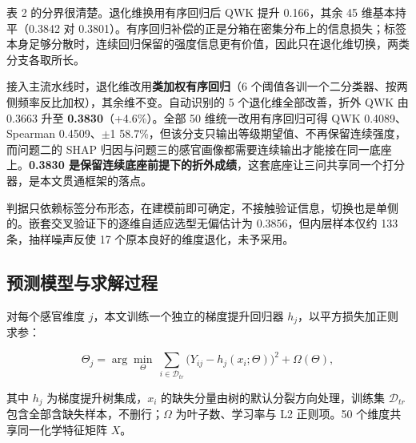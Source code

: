 \documentclass[zihao=-4,a4paper,UTF8,fontset=none]{ctexart}
\begin{document}
表 2 的分界很清楚。退化维换用有序回归后 QWK 提升 0.166，其余 45 维基本持平（0.3842 对 0.3801）。有序回归补偿的正是分箱在密集分布上的信息损失；标签本身足够分散时，连续回归保留的强度信息更有价值，因此只在退化维切换，两类分支各取所长。

接入主流水线时，退化维改用\textbf{类加权有序回归}（6 个阈值各训一个二分类器、按两侧频率反比加权），其余维不变。自动识别的 5 个退化维全部改善，折外 QWK 由 0.3663 升至 \textbf{0.3830}（+4.6\%）。全部 50 维统一改用有序回归可得 QWK 0.4089、Spearman 0.4509、$\pm$1 58.7\%，但该分支只输出等级期望值、不再保留连续强度，而问题二的 SHAP 归因与问题三的感官画像都需要连续输出才能接在同一底座上。\textbf{0.3830 是保留连续底座前提下的折外成绩}，这套底座让三问共享同一个打分器，是本文贯通框架的落点。

判据只依赖标签分布形态，在建模前即可确定，不接触验证信息，切换也是单侧的。嵌套交叉验证下的逐维自适应选型无偏估计为 0.3856，但内层样本仅约 133 条，抽样噪声反使 17 个原本良好的维度退化，未予采用。

\subsection{预测模型与求解过程}

对每个感官维度 $j$，本文训练一个独立的梯度提升回归器 $h_j$，以平方损失加正则求参：

\begin{equation}
\Theta_j=\arg\min_{\Theta}\ \sum_{i\in\mathcal{D}_{tr}}\big(Y_{ij}-h_j(x_i;\Theta)\big)^2+\Omega(\Theta),
\end{equation}

其中 $h_j$ 为梯度提升树集成，$x_i$ 的缺失分量由树的默认分裂方向处理，训练集 $\mathcal{D}_{tr}$ 包含全部含缺失样本，不删行；$\Omega$ 为叶子数、学习率与 L2 正则项。50 个维度共享同一化学特征矩阵 $X$。
\end{document}
